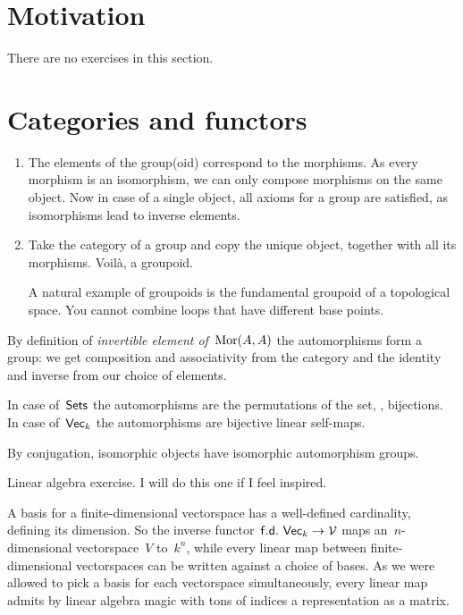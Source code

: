 \section{Motivation}

There are no exercises in this section.


\section{Categories and functors}

\begin{exercise}
  \begin{enumerate}
    \item The elements of the group(oid) correspond to the morphisms. As every morphism is an isomorphism, we can only compose morphisms on the same object. Now in case of a single object, all axioms for a group are satisfied, as isomorphisms lead to inverse elements.

    \item Take the category of a group and copy the unique object, together with all its morphisms. Voil\`a, a groupoid.

      A natural example of groupoids is the fundamental groupoid of a topological space. You cannot combine loops that have different base points.
  \end{enumerate}
\end{exercise}

\begin{exercise}
  By definition of \emph{invertible element of~$\operatorname{Mor}(A,A)$} the automorphisms form a group: we get composition and associativity from the category and the identity and inverse from our choice of elements.
  
  In case of~$\mathsf{Sets}$ the automorphisms are the permutations of the set, \ie, bijections. In case of~$\mathsf{Vec}_k$ the automorphisms are bijective linear self-maps.

  By conjugation, isomorphic objects have isomorphic automorphism groups.
\end{exercise}

\begin{exercise} %
  Linear algebra exercise. I will do this one if I feel inspired.
\end{exercise}

\begin{exercise}
  A basis for a finite-dimensional vectorspace has a well-defined cardinality, defining its dimension. So the inverse functor~$\mathsf{f.d.\ Vec}_k\to\mathcal{V}$ maps an~$n$\nobreakdash-dimensional vectorspace~$V$ to~$k^n$, while every linear map between finite-dimensional vectorspaces can be written against a choice of bases. As we were allowed to pick a basis for each vectorspace simultaneously, every linear map admits by linear algebra magic with tons of indices a representation as a matrix.
\end{exercise}


